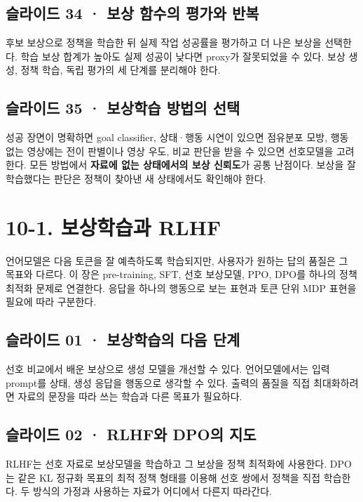 \documentclass[11pt,a4paper]{article}
\begin{document}
\subsection{슬라이드 34 · 보상 함수의 평가와 반복}

후보 보상으로 정책을 학습한 뒤 실제 작업 성공률을 평가하고 더 나은 보상을 선택한다. 학습 보상 합계가 높아도 실제 성공이 낮다면 proxy가 잘못되었을 수 있다. 보상 생성, 정책 학습, 독립 평가의 세 단계를 분리해야 한다.\par

\subsection{슬라이드 35 · 보상학습 방법의 선택}

성공 장면이 명확하면 goal classifier, 상태·행동 시연이 있으면 점유분포 모방, 행동 없는 영상에는 전이 판별이나 영상 우도, 비교 판단을 받을 수 있으면 선호모델을 고려한다. 모든 방법에서 \textbf{자료에 없는 상태에서의 보상 신뢰도}가 공통 난점이다. 보상을 잘 학습했다는 판단은 정책이 찾아낸 새 상태에서도 확인해야 한다.\par

\clearpage
\section{10-1. 보상학습과 RLHF}


언어모델은 다음 토큰을 잘 예측하도록 학습되지만, 사용자가 원하는 답의 품질은 그 목표와 다르다. 이 장은 pre-training, SFT, 선호 보상모델, PPO, DPO를 하나의 정책 최적화 문제로 연결한다. 응답을 하나의 행동으로 보는 표현과 토큰 단위 MDP 표현을 필요에 따라 구분한다.\par

\subsection{슬라이드 01 · 보상학습의 다음 단계}

선호 비교에서 배운 보상으로 생성 모델을 개선할 수 있다. 언어모델에서는 입력 prompt를 상태, 생성 응답을 행동으로 생각할 수 있다. 출력의 품질을 직접 최대화하려면 자료의 문장을 따라 쓰는 학습과 다른 목표가 필요하다.\par

\subsection{슬라이드 02 · RLHF와 DPO의 지도}

RLHF는 선호 자료로 보상모델을 학습하고 그 보상을 정책 최적화에 사용한다. DPO는 같은 KL 정규화 목표의 최적 정책 형태를 이용해 선호 쌍에서 정책을 직접 학습한다. 두 방식의 가정과 사용하는 자료가 어디에서 다른지 따라간다.\par
\end{document}

